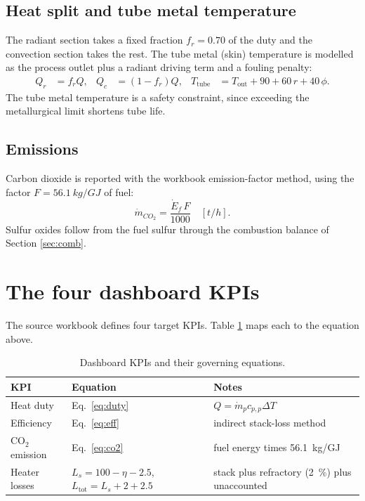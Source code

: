 \documentclass[11pt,a4paper]{article}
\begin{document}
\subsection{Heat split and tube metal temperature}
The radiant section takes a fixed fraction $f_r=0.70$ of the duty and the
convection section takes the rest. The tube metal (skin) temperature is modelled
as the process outlet plus a radiant driving term and a fouling penalty:
\begin{align}
Q_r &= f_r Q, & Q_c &= (1-f_r)Q, &
T_\mathrm{tube} &= T_\mathrm{out} + 90 + 60\,r + 40\,\phi .
\end{align}
The tube metal temperature is a safety constraint, since exceeding the
metallurgical limit shortens tube life.

\subsection{Emissions}
Carbon dioxide is reported with the workbook emission-factor method, using the
factor $F=\SI{56.1}{kg/GJ}$ of fuel:
\begin{equation}
\dot m_{CO_2} = \frac{\dot E_f\, F}{1000}\quad[\si{t/h}].
\label{eq:co2}
\end{equation}
Sulfur oxides follow from the fuel sulfur through the combustion balance of
Section \ref{sec:comb}.

\section{The four dashboard KPIs}\label{sec:kpi}

The source workbook defines four target KPIs. Table \ref{tab:kpi} maps each to the
equation above.

\begin{table}[h]
\centering\small
\caption{Dashboard KPIs and their governing equations.}
\label{tab:kpi}
\begin{tabular}{@{}lll@{}}
\toprule
KPI & Equation & Notes\\
\midrule
Heat duty & Eq.~\eqref{eq:duty} & $Q=\dot m_p c_{p,p}\Delta T$\\
Efficiency & Eq.~\eqref{eq:eff} & indirect stack-loss method\\
CO$_2$ emission & Eq.~\eqref{eq:co2} & fuel energy times \SI{56.1}{kg/GJ}\\
Heater losses & $L_s=100-\eta-2.5$, $L_\mathrm{tot}=L_s+2+2.5$ & stack plus refractory (\SI{2}{\percent}) plus unaccounted\\
\bottomrule
\end{tabular}
\end{table}
\end{document}
